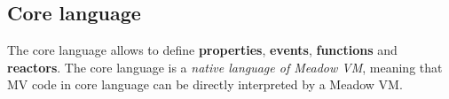 \documentclass{note}
\begin{document}
{%





\subsection{Core language}
The core language allows to define 
\textcolor{blue2}{\bf properties}, 
\textcolor{blue2}{\bf events}, 
\textcolor{blue2}{\bf functions} and 
\textcolor{blue2}{\bf reactors}. 
The core language is a \textcolor{green2}{\em native language of Meadow VM\/},
meaning that MV code in core language can be directly interpreted by a
Meadow VM. 


}
\end{document}
